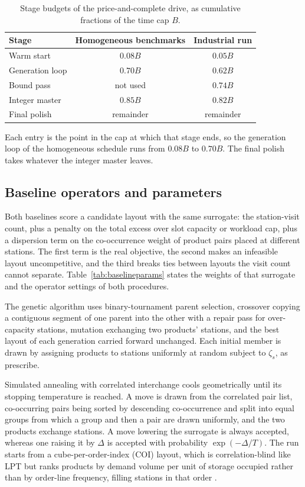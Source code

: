 \documentclass[11pt]{article}
\newcommand{\tbl}[1]{\caption{#1}}
\newcommand{\tabnote}[1]{\vspace{2pt}\footnotesize\raggedright #1\par}
\begin{document}
\begin{table}[H]
\centering
\tbl{Stage budgets of the price-and-complete drive, as cumulative fractions of the time cap $B$.}
{\begin{tabular*}{\textwidth}{@{\extracolsep{\fill}}lcc@{}}
\toprule
Stage & Homogeneous benchmarks & Industrial run \\
\midrule
Warm start      & $0.08B$   & $0.05B$   \\
Generation loop & $0.70B$   & $0.62B$   \\
Bound pass      & not used  & $0.74B$   \\
Integer master  & $0.85B$   & $0.82B$   \\
Final polish    & remainder & remainder \\
\bottomrule
\end{tabular*}}
\tabnote{Each entry is the point in the cap at which that stage ends, so the generation loop of the homogeneous schedule runs from $0.08B$ to $0.70B$. The final polish takes whatever the integer master leaves.}
\label{tab:budgets}
\end{table}

\subsection{Baseline operators and parameters}\label{sup:baselines}
Both baselines score a candidate layout with the same surrogate: the station-visit count, plus a
penalty on the total excess over slot capacity or workload cap, plus a dispersion term on the
co-occurrence weight of product pairs placed at different stations. The first term is the real
objective, the second makes an infeasible layout uncompetitive, and the third breaks ties between
layouts the visit count cannot separate. Table~\ref{tab:baselineparams} states the weights of that
surrogate and the operator settings of both procedures.

The genetic algorithm uses binary-tournament parent selection, crossover copying a contiguous
segment of one parent into the other with a repair pass for over-capacity stations, mutation
exchanging two products' stations, and the best layout of each generation carried forward
unchanged. Each initial member is drawn by assigning products to stations uniformly at random
subject to $\zeta_s$, as \citet{pan2015} prescribe.

Simulated annealing with correlated interchange cools geometrically until its stopping temperature
is reached. A move is drawn from the correlated pair list, co-occurring pairs being sorted by
descending co-occurrence and split into equal groups from which a group and then a pair are drawn
uniformly, and the two products exchange stations. A move lowering the surrogate is always
accepted, whereas one raising it by $\Delta$ is accepted with probability $\exp(-\Delta/T)$. The
run starts from a cube-per-order-index (COI) layout, which is correlation-blind like LPT but ranks
products by demand volume per unit of storage occupied rather than by order-line frequency, filling
stations in that order \citep{kim2012}.
\end{document}
